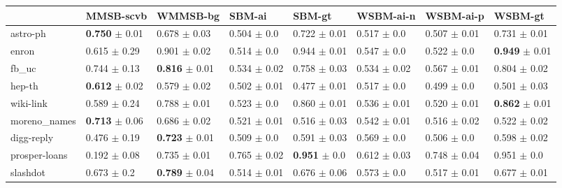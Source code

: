 \begin{tabular}{llllllll}
\hline
               & MMSB-scvb                   & WMMSB-bg                & SBM-ai           & SBM-gt                   & WSBM-ai-n        & WSBM-ai-p        & WSBM-gt                   \\
\hline
 astro-ph      & \textbf{0.750} $\pm$ 0.01  & 0.678 $\pm$ 0.03          & 0.504 $\pm$ 0.0  & 0.722 $\pm$ 0.01         & 0.517 $\pm$ 0.0  & 0.507 $\pm$ 0.01 & 0.731 $\pm$ 0.01          \\
 enron         & 0.615 $\pm$ 0.29           & 0.901 $\pm$ 0.02          & 0.514 $\pm$ 0.0  & 0.944 $\pm$ 0.01         & 0.547 $\pm$ 0.0  & 0.522 $\pm$ 0.0  & \textbf{0.949} $\pm$ 0.01 \\
 fb\_uc         & 0.744 $\pm$ 0.13          & \textbf{0.816} $\pm$ 0.01 & 0.534 $\pm$ 0.02 & 0.758 $\pm$ 0.03         & 0.534 $\pm$ 0.02 & 0.567 $\pm$ 0.01 & 0.804 $\pm$ 0.02          \\
 hep-th        & \textbf{0.612} $\pm$ 0.02  & 0.579 $\pm$ 0.02          & 0.502 $\pm$ 0.01 & 0.477 $\pm$ 0.01         & 0.517 $\pm$ 0.0  & 0.499 $\pm$ 0.0  & 0.501 $\pm$ 0.03          \\
 wiki-link     & 0.589 $\pm$ 0.24           & 0.788 $\pm$ 0.01          & 0.523 $\pm$ 0.0  & 0.860 $\pm$ 0.01         & 0.536 $\pm$ 0.01 & 0.520 $\pm$ 0.01 & \textbf{0.862} $\pm$ 0.01 \\
 moreno\_names  & \textbf{0.713} $\pm$ 0.06 & 0.686 $\pm$ 0.02          & 0.521 $\pm$ 0.01 & 0.516 $\pm$ 0.03         & 0.542 $\pm$ 0.01 & 0.516 $\pm$ 0.02 & 0.522 $\pm$ 0.02          \\
 digg-reply    & 0.476 $\pm$ 0.19           & \textbf{0.723} $\pm$ 0.01 & 0.509 $\pm$ 0.0  & 0.591 $\pm$ 0.03         & 0.569 $\pm$ 0.0  & 0.506 $\pm$ 0.0  & 0.598 $\pm$ 0.02          \\
 prosper-loans & 0.192 $\pm$ 0.08           & 0.735 $\pm$ 0.01          & 0.765 $\pm$ 0.02 & \textbf{0.951} $\pm$ 0.0 & 0.612 $\pm$ 0.03 & 0.748 $\pm$ 0.04 & 0.951 $\pm$ 0.0           \\
 slashdot      & 0.673 $\pm$ 0.2            & \textbf{0.789} $\pm$ 0.04 & 0.514 $\pm$ 0.01 & 0.676 $\pm$ 0.06         & 0.573 $\pm$ 0.0  & 0.517 $\pm$ 0.01 & 0.677 $\pm$ 0.01          \\
\hline
\end{tabular}



